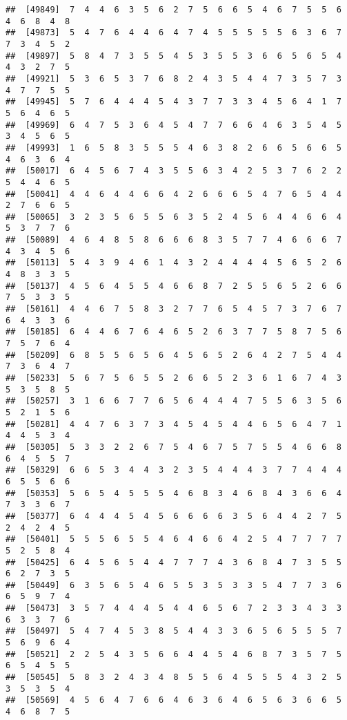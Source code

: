 \documentclass[
]{book}
\begin{document}
\begin{verbatim}
##  [49849]  7  4  4  6  3  5  6  2  7  5  6  6  5  4  6  7  5  5  6  4  6  8  4  8
##  [49873]  5  4  7  6  4  4  6  4  7  4  5  5  5  5  5  6  3  6  7  7  3  4  5  2
##  [49897]  5  8  4  7  3  5  5  4  5  3  5  5  3  6  6  5  6  5  4  4  3  2  7  5
##  [49921]  5  3  6  5  3  7  6  8  2  4  3  5  4  4  7  3  5  7  3  4  7  7  5  5
##  [49945]  5  7  6  4  4  4  5  4  3  7  7  3  3  4  5  6  4  1  7  5  6  4  6  5
##  [49969]  6  4  7  5  3  6  4  5  4  7  7  6  6  4  6  3  5  4  5  3  4  5  6  5
##  [49993]  1  6  5  8  3  5  5  5  4  6  3  8  2  6  6  5  6  6  5  4  6  3  6  4
##  [50017]  6  4  5  6  7  4  3  5  5  6  3  4  2  5  3  7  6  2  2  5  4  4  6  5
##  [50041]  4  4  6  4  4  6  6  4  2  6  6  6  5  4  7  6  5  4  4  2  7  6  6  5
##  [50065]  3  2  3  5  6  5  5  6  3  5  2  4  5  6  4  4  6  6  4  5  3  7  7  6
##  [50089]  4  6  4  8  5  8  6  6  6  8  3  5  7  7  4  6  6  6  7  4  3  4  5  6
##  [50113]  5  4  3  9  4  6  1  4  3  2  4  4  4  4  5  6  5  2  6  4  8  3  3  5
##  [50137]  4  5  6  4  5  5  4  6  6  8  7  2  5  5  6  5  2  6  6  7  5  3  3  5
##  [50161]  4  4  6  7  5  8  3  2  7  7  6  5  4  5  7  3  7  6  7  6  4  3  3  6
##  [50185]  6  4  4  6  7  6  4  6  5  2  6  3  7  7  5  8  7  5  6  7  5  7  6  4
##  [50209]  6  8  5  5  6  5  6  4  5  6  5  2  6  4  2  7  5  4  4  7  3  6  4  7
##  [50233]  5  6  7  5  6  5  5  2  6  6  5  2  3  6  1  6  7  4  3  5  3  5  8  5
##  [50257]  3  1  6  6  7  7  6  5  6  4  4  4  7  5  5  6  3  5  6  5  2  1  5  6
##  [50281]  4  4  7  6  3  7  3  4  5  4  5  4  4  6  5  6  4  7  1  4  4  5  3  4
##  [50305]  5  3  3  2  2  6  7  5  4  6  7  5  7  5  5  4  6  6  8  6  4  5  5  7
##  [50329]  6  6  5  3  4  4  3  2  3  5  4  4  4  3  7  7  4  4  4  6  5  5  6  6
##  [50353]  5  6  5  4  5  5  5  4  6  8  3  4  6  8  4  3  6  6  4  7  3  3  6  7
##  [50377]  6  4  4  4  5  4  5  6  6  6  6  3  5  6  4  4  2  7  5  2  4  2  4  5
##  [50401]  5  5  5  6  5  5  4  6  4  6  6  4  2  5  4  7  7  7  7  5  2  5  8  4
##  [50425]  6  4  5  6  5  4  4  7  7  7  4  3  6  8  4  7  3  5  5  6  2  7  3  5
##  [50449]  6  3  5  6  5  4  6  5  5  3  5  3  3  5  4  7  7  3  6  6  5  9  7  4
##  [50473]  3  5  7  4  4  4  5  4  4  6  5  6  7  2  3  3  4  3  3  6  3  3  7  6
##  [50497]  5  4  7  4  5  3  8  5  4  4  3  3  6  5  6  5  5  5  7  5  6  9  6  4
##  [50521]  2  2  5  4  3  5  6  6  4  4  5  4  6  8  7  3  5  7  5  6  5  4  5  5
##  [50545]  5  8  3  2  4  3  4  8  5  5  6  4  5  5  5  4  3  2  5  3  5  3  5  4
##  [50569]  4  5  6  4  7  6  6  4  6  3  6  4  6  5  6  3  6  6  5  4  6  8  7  5

\end{verbatim}
\end{document}

